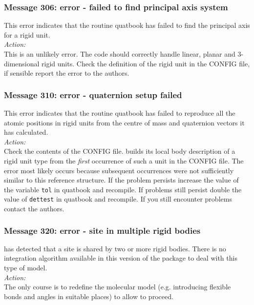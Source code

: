 \subsubsection*{Message 306: error - failed to find principal axis
system}

This error indicates that the routine {\sc quatbook} has failed to
find the principal axis for a rigid unit. \\

\noindent
{\em Action:}\\
This is an unlikely error. The code should correctly handle linear,
planar and 3-dimensional rigid units. Check the definition of the
rigid unit in the CONFIG file, if sensible report the error to the
authors.

\subsubsection*{Message 310: error - quaternion setup failed}

This error indicates that the routine {\sc quatbook} has failed to
reproduce all the atomic positions in rigid units from the
centre of mass and quaternion vectors it has calculated. \\

\noindent
{\em Action:}\\ Check the contents of the CONFIG file. \D{} builds its
local body description of a rigid unit type from the {\em first} occurrence
of such a unit in the CONFIG file. The error most likely occurs because 
subsequent occurrences were not sufficiently similar to this reference
structure. If the problem persists increase the value of the variable
{\tt tol} in {\sc quatbook} and recompile. If problems still persist
double the value of {\tt dettest} in {\sc quatbook} and recompile.
If you still encounter problems contact the authors.

\subsubsection*{Message 320: error - site in multiple rigid bodies}

\D{} has detected that a site is shared by two or more rigid
bodies. There is no integration algorithm available in this version of
the package to deal with this type of model. \\

\noindent
{\em Action:}\\
The only course is to redefine the molecular model (e.g. introducing
flexible bonds and angles in suitable places) to allow \D{}
to proceed.

